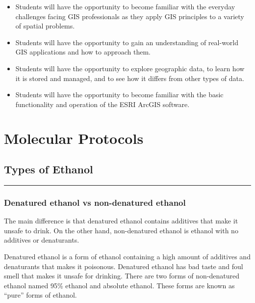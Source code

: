 \documentclass[
  letterpaper,
  DIV=11,
  numbers=noendperiod]{scrreprt}
\begin{document}
\begin{itemize}
\item
  Students will have the opportunity to become familiar with the
  everyday challenges facing GIS professionals as they apply GIS
  principles to a variety of spatial problems.
\item
  Students will have the opportunity to gain an understanding of
  real-world GIS applications and how to approach them.
\item
  Students will have the opportunity to explore geographic data, to
  learn how it is stored and managed, and to see how it differs from
  other types of data.
\item
  Students will have the opportunity to become familiar with the basic
  functionality and operation of the ESRI ArcGIS software.
\end{itemize}

\part{Molecular Protocols}

\hypertarget{types-of-ethanol}{%
\chapter{Types of Ethanol}\label{types-of-ethanol}}

\begin{center}\rule{0.5\linewidth}{0.5pt}\end{center}

\hypertarget{denatured-ethanol-vs-non-denatured-ethanol}{%
\section*{\texorpdfstring{\textbf{Denatured ethanol vs non-denatured
ethanol}}{Denatured ethanol vs non-denatured ethanol}}\label{denatured-ethanol-vs-non-denatured-ethanol}}

The main difference is that denatured ethanol contains additives that
make it unsafe to drink. On the other hand, non-denatured ethanol is
ethanol with no additives or denaturants.

Denatured ethanol is a form of ethanol containing a high amount of
additives and denaturants that makes it poisonous. Denatured ethanol has
bad taste and foul smell that makes it unsafe for drinking. There are
two forms of non-denatured ethanol named 95\% ethanol and absolute
ethanol. These forms are known as ``pure'' forms of ethanol.
\end{document}
